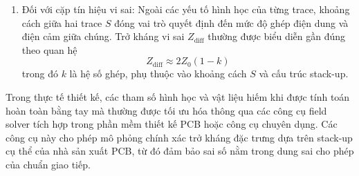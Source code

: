 \begin{enumerate}
                            \item Đối với cặp tín hiệu vi sai: Ngoài các yếu tố hình học của từng trace, khoảng cách giữa hai trace \(S\) đóng vai trò quyết định đến mức độ ghép điện dung và điện cảm giữa chúng. Trở kháng vi sai \(Z_{\text{diff}}\) thường được biểu diễn gần đúng theo quan hệ
                            \begin{equation}
                                Z_{\text{diff}} \approx 2 Z_0 (1 - k)
                            \end{equation}
                            trong đó \(k\) là hệ số ghép, phụ thuộc vào khoảng cách \(S\) và cấu trúc stack-up.
                        \end{enumerate}
                        
                        Trong thực tế thiết kế, các tham số hình học và vật liệu hiếm khi được tính toán hoàn toàn bằng tay mà thường được tối ưu hóa thông qua các công cụ field solver tích hợp trong phần mềm thiết kế PCB hoặc công cụ chuyên dụng. Các công cụ này cho phép mô phỏng chính xác trở kháng đặc trưng dựa trên stack-up cụ thể của nhà sản xuất PCB, từ đó đảm bảo sai số nằm trong dung sai cho phép của chuẩn giao tiếp.
                        


